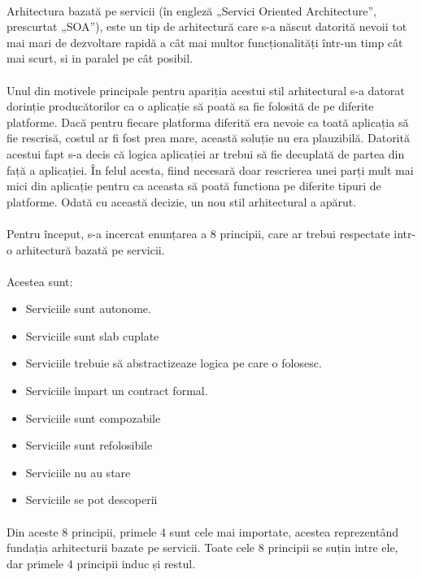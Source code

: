 \documentclass[12pt]{report}
\begin{document}
	\paragraph{}Arhitectura bazată pe servicii (în engleză „Servici Oriented Architecture”, prescurtat „SOA”), este un tip de arhitectură care s-a născut datorită nevoii tot mai mari de dezvoltare rapidă a cât mai multor funcționalități într-un timp cât mai scurt, si in paralel pe cât posibil.
	\paragraph{}Unul din motivele principale pentru apariția acestui stil arhitectural s-a datorat dorinție producătorilor ca o aplicație să poată sa fie folosită de pe diferite platforme. Dacă pentru fiecare platforma diferită era nevoie ca toată aplicația să fie rescrisă, costul ar fi fost prea mare, această soluție nu era plauzibilă. Datorită acestui fapt s-a decis că logica aplicației ar trebui să fie decuplată de partea din față a aplicației. În felul acesta, fiind necesară doar rescrierea  unei parți mult mai mici din aplicație pentru ca aceasta să poată functiona pe diferite tipuri de platforme. Odată cu această decizie, un nou stil arhitectural a apărut.
	\paragraph{}Pentru început, s-a incercat enunțarea a 8 principii, care ar trebui respectate intr-o arhitectură bazată pe servicii.
	\paragraph{}Acestea sunt:
	\begin{itemize}
	\item Serviciile sunt autonome.
	\item Serviciile sunt slab cuplate
	\item Serviciile trebuie să abstractizeaze logica pe care o folosesc.
	\item Serviciile împart un contract formal.
	\item Serviciile sunt compozabile
	\item Serviciile sunt refolosibile
	\item Serviciile nu au stare
	\item Serviciile se pot descoperii
	\end{itemize}
	\paragraph{}Din aceste 8 principii, primele 4 sunt cele mai importate, acestea reprezentând fundația arhitecturii bazate pe servicii. Toate cele 8 principii se suțin intre ele, dar primele 4 principii induc și restul.
\end{document}
